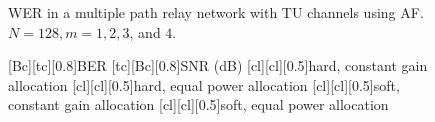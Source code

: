 \begin{figure}
{}
\caption{WER in a multiple path relay network with TU channels using AF.  $N = 128, m = 1, 2, 3$, and $4$.}
\label{fig:mp_af_wer_plots_TU}
\end{figure}

\begin{figure}
    [Bc][tc][0.8]{BER}
    [tc][Bc][0.8]{SNR (dB)}
    [cl][cl][0.5]{hard, constant gain allocation}
    [cl][cl][0.5]{hard, equal power allocation}
    [cl][cl][0.5]{soft, constant gain allocation}
    [cl][cl][0.5]{soft, equal power allocation}

\centerline{
	 \\
}
\centerline{
}
\end{figure}
